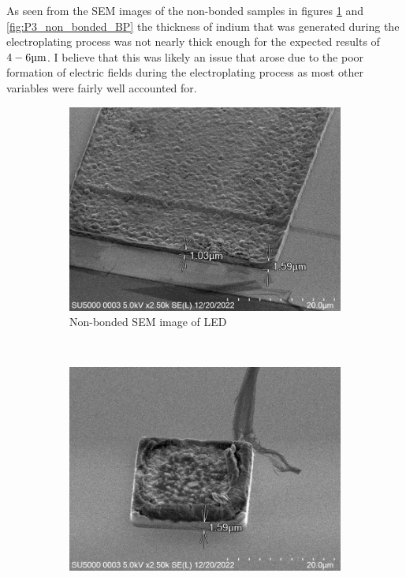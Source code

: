 As seen from the SEM images of the non-bonded samples in figures \ref{fig:P3_non_bonded_LED} and \ref{fig:P3_non_bonded_BP} the thickness of indium that was generated during the electroplating process was not nearly thick enough for the expected results of $4-6\um$. I believe that this was likely an issue that arose due to the poor formation of electric fields during the electroplating process as most other variables were fairly well accounted for.


\begin{figure}
    \centering
    \begin{subfigure}[t]{0.45\textwidth}
        \includegraphics[width=\textwidth]{Main/Ch4/Phase-4/Non-Bonded/LED/IMG_No0003.png}
        \caption{Non-bonded SEM image of LED}
        \label{fig:P3_non_bonded_LED}
    \end{subfigure}
    ~
    \begin{subfigure}[t]{0.45\textwidth}
        \includegraphics[width=\textwidth]{Main/Ch4/Phase-4/Non-Bonded/BP/IMG_No0003.png}

\end{subfigure}
\end{figure}
